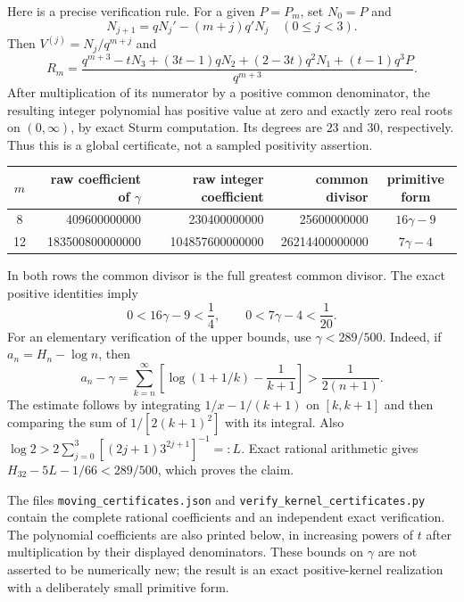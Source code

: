 \documentclass[11pt,a4paper]{article}
\theoremstyle{definition}
\theoremstyle{remark}
\numberwithin{equation}{section}
\begin{document}
Here is a precise verification rule. For a given $P=P_m$, set $N_0=P$ and
\[
 N_{j+1}=qN_j'-(m+j)q'N_j\quad(0\leq j<3).
\]
Then $V^{(j)}=N_j/q^{m+j}$ and
\begin{equation}
 R_m=\frac{q^{m+3}-tN_3+(3t-1)qN_2
                +(2-3t)q^2N_1+(t-1)q^3P}{q^{m+3}}.
 \label{p6:nk:numerator}
\end{equation}
After multiplication of its numerator by a positive common denominator,
the resulting integer polynomial has positive value at zero and exactly
zero real roots on $(0,\infty)$, by exact Sturm computation. Its degrees
are $23$ and $30$, respectively. Thus this is a global certificate,
not a sampled positivity assertion.

\begin{center}
\begin{tabular}{c|r|r|r|c}
$m$ & raw coefficient of $\gamma$ & raw integer coefficient
 & common divisor & primitive form\\\hline
8&409600000000&230400000000&25600000000&$16\gamma-9$\\
12&183500800000000&104857600000000&26214400000000&$7\gamma-4$
\end{tabular}
\end{center}
In both rows the common divisor is the full greatest common divisor.
The exact positive identities imply
\[
 0<16\gamma-9<\frac14,\qquad
 0<7\gamma-4<\frac1{20}.
\]
For an elementary verification of the upper bounds, use
$\gamma<289/500$. Indeed, if $a_n=H_n-\log n$, then
\[
 a_n-\gamma=
 \sum_{k=n}^\infty\left[\log(1+1/k)-\frac1{k+1}\right]
 >\frac1{2(n+1)}.
\]
The estimate follows by integrating $1/x-1/(k+1)$ on $[k,k+1]$
and then comparing the sum of $1/[2(k+1)^2]$ with its integral.
Also $\log2>2\sum_{j=0}^3[(2j+1)3^{2j+1}]^{-1}=:L$.
Exact rational arithmetic gives
$H_{32}-5L-1/66<289/500$, which proves the claim.

The files \texttt{moving\_certificates.json} and
\texttt{verify\_kernel\_certificates.py} contain the complete rational
coefficients and an independent exact verification. The polynomial
coefficients are also printed below, in increasing powers of $t$ after
multiplication by their displayed denominators. These bounds on
$\gamma$ are not asserted to be numerically new; the result is an exact
positive-kernel realization with a deliberately small primitive form.
\end{document}

